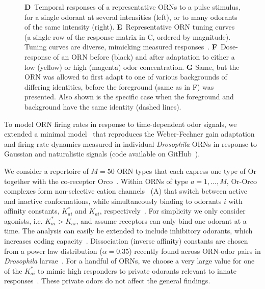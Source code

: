 \documentclass[9pt,lineno]{elife}
\begin{document}
\begin{figure}
\begin{fullwidth}
{{			\textbf{D}~Temporal responses of a representative ORNs to a pulse stimulus, for a single odorant at several intensities (left), or to many odorants of the same intensity (right).
			\textbf{E}~Representative ORN tuning curves (a single row of the response matrix in C, ordered by magnitude). Tuning curves are diverse, mimicking measured responses~\citep{hallem_carlson}.
			\textbf{F}~Dose-response of an ORN before (black) and after adaptation to either a low (yellow) or high (magenta) odor concentration.  
			\textbf{G} Same, but the ORN was allowed to first adapt to one of various backgrounds of differing identities, before the foreground (same as in F) was presented. Also shown is the specific case when the foreground and background have the same identity (dashed lines).}
			}
		\label{fig:tuning_curves}
	\end{fullwidth}
\end{figure}






To model ORN firing rates in response to time-dependent odor signals, we extended a minimal model~\citep{srinivas_elife} that reproduces the Weber-Fechner gain adaptation and firing rate dynamics measured in individual \textit{Drosophila} ORNs in response to Gaussian and naturalistic signals (code available on GitHub~\citep{code}). 

We consider a repertoire of $M=50$ ORN types that each express one type of Or together with the co-receptor Orco~\citep{Orco}. Within ORNs of type $a=1,...,M$, Or-Orco complexes form non-selective cation channels~\citep{orco_structure} (A) that switch between active and inactive conformations, while simultaneously binding to odorants $i$ with affinity constants, $K^*_{ai}$ and $K_{ai}$, respectively~\citep{nagel_wilson_biophysical,srinivas_elife}. For simplicity we only consider agonists, i.e. $K^*_{ai} > K_{ai}$, and assume receptors can only bind one odorant at a time. The analysis can easily be extended to include inhibitory odorants, which increases coding capacity~\citep{Cao_Tu_WL}. Dissociation (inverse affinity) constants are chosen from a power law distribution ($\alpha = 0.35$) recently found across ORN-odor pairs in \textit{Drosophila} larvae~\citep{si2017invariances}. For a handful of ORNs, we choose a very large value for one of the $K^*_{ai}$ to mimic high responders to private odorants relevant to innate responses~\citep{geosmin}. These private odors do not affect the general findings. 
\end{document}
